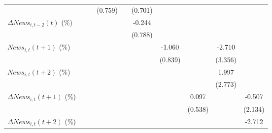 {\begin{tabular}{l*{9}{c}}
                    &                     &                     &     (0.759)         &                     &     (0.701)         &                     &                     &                     &                     \\
\addlinespace
$ \Delta News_{i,t-2}(t)$ (\%)&                     &                     &                     &                     &      -0.244         &                     &                     &                     &                     \\
                    &                     &                     &                     &                     &     (0.788)         &                     &                     &                     &                     \\
\addlinespace
$ News_{i,t}(t+1)$ (\%)&                     &                     &                     &                     &                     &      -1.060         &                     &      -2.710         &                     \\
                    &                     &                     &                     &                     &                     &     (0.839)         &                     &     (3.356)         &                     \\
\addlinespace
$ News_{i,t}(t+2)$ (\%)&                     &                     &                     &                     &                     &                     &                     &       1.997         &                     \\
                    &                     &                     &                     &                     &                     &                     &                     &     (2.773)         &                     \\
\addlinespace
$ \Delta News_{i,t}(t+1)$ (\%)&                     &                     &                     &                     &                     &                     &       0.097         &                     &      -0.507         \\
                    &                     &                     &                     &                     &                     &                     &     (0.538)         &                     &     (2.134)         \\
\addlinespace
$ \Delta News_{i,t}(t+2)$ (\%)&                     &                     &                     &                     &                     &                     &                     &                     &      -2.712\sym{**} \\

\end{tabular}}
